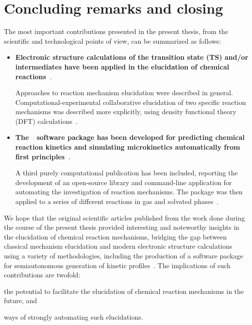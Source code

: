 \chapter{Concluding remarks and closing}%
\label{ch:conclusion}


The most important contributions presented in the present thesis,
from the scientific and technological points of view, can be summarized as follows:

\begin{itemize}
	\item \textbf{Electronic structure calculations of the transition state (TS)
		      and/or intermediates have been applied
		      in the elucidation of chemical reactions~\cite{Coelho_2019,Oliveira_2020}}.

	      Approaches to reaction mechanism elucidation were described in general.
	      Computational-experimental collaborative elucidation of two specific reaction mechanisms was described more explicitly,
	      using density functional theory (DFT) calculations~\cite{Coelho_2019,Oliveira_2020}.

	\item \textbf{The~\overreact{}~software package has been developed for predicting chemical reaction kinetics
		      and simulating microkinetics automatically from first principles~\cite{Schneider2022}}.

	      A third purely computational publication has been included,
	      reporting the development of an open-source library
	      and command-line application for automating the investigation
	      of reaction mechanisms.
	      The package was then applied to a series of different reactions
	      in gas and solvated phases~\cite{Schneider2022}.
\end{itemize}


We hope that the original scientific articles published from the work done
during the course of the present thesis provided
interesting and noteworthy insights in the elucidation of chemical reaction mechanisms,
bridging the gap between classical mechanism elucidation
and modern electronic structure calculations using a variety of methodologies,
including the production of a software package for semiautonomous generation
of kinetic profiles~\cite{Schneider2022}.
The implications of such contributions are twofold:
%
\begin{itemize*}
	\item the potential to facilitate the elucidation of chemical reaction mechanisms in the future, and
	\item ways of strongly automating such elucidations.
\end{itemize*}

